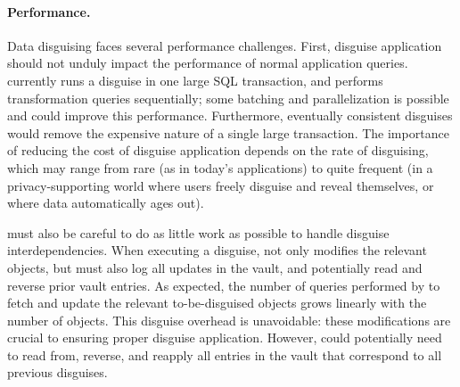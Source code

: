 \paragraph{Performance.}
\label{sec:perf}

Data disguising faces several performance challenges. 
%
First, disguise application should not unduly impact the performance of normal application queries.
\sys currently runs a disguise in one large SQL transaction, and performs transformation queries
sequentially; some batching and parallelization is possible and could improve this performance.
Furthermore, eventually consistent disguises would remove the expensive nature of a single large
transaction.  The importance of reducing the cost of disguise application depends on the rate of
disguising, which may range from rare (as in today's applications) to quite frequent (in a
privacy-supporting world where users freely disguise and reveal themselves, or where data
automatically ages out).

%
\sys must also be careful to do as little work as possible to handle disguise interdependencies. 
When executing a disguise, \sys not only modifies the relevant objects, but must also 
log all updates in the vault, and potentially read and reverse prior vault entries.
%
As expected, the number of queries performed by \sys to fetch and update the relevant to-be-disguised objects
grows linearly with the number of objects. This disguise overhead is unavoidable: these
modifications are crucial to ensuring proper disguise application. 
However, \sys could potentially need to read from, reverse, and reapply all entries in the vault
that correspond to all previous disguises.
